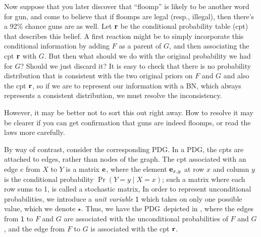 \documentclass{article}
\newcommand{\MN}{PDG}
\numberwithin{equation}{section}
\begin{document}
\begin{example}
		Now suppose that you later discover that ``floomp'' is likely to be another word for gun, and come to believe that if floomps are legal (resp., illegal), then there's a 92\% chance guns are as well. Let $\mathbf r$ be the conditional probability table (cpt) that describes this belief. A first reaction might be to simply incorporate this conditional information by adding $F$ as a parent of $G$, and then associating the cpt $\mathbf r$ with $G$. But then what should we do with the original probability we had for $G$?  Should we just discard it?
		It is easy to check that there is no probability distribution that is consistent with the two original priors on $F$ and $G$ and also the cpt $\mathbf r$, so if we are to represent our information with a BN, which always represents a consistent distribution, we must resolve the inconsistency.  
			
%		
		However, it may be better not to sort this out right away. How to resolve it may be clearer if you can get confirmation that guns are indeed floomps, or read the laws more carefully.

		By way of contrast, consider the corresponding \MN.
		In a \MN, the cpts are attached to edges, rather than nodes of the graph. The cpt associated with an edge $e$ from $X$ to $Y$ is a matrix $\mathbf e$, where the element $\mathbf e_{x,y}$ at row $x$ and column $y$ is the conditional probability $\Pr(Y \!\!=\!\!y \mid X \!\!=\!\! x)$; such a matrix where each row sums to 1, is called a stochastic matrix, In order to represent unconditional probabilities, we introduce a \emph{unit variable} $\mathsf 1$ which takes on only one possible value,	which we denote $\star$.
		Thus, we have the \MN\ depicted in , where the edges from $\mathsf 1$ to $F$ and $G$ are associated with the unconditional probabilities of $F$ and $G$, and the edge from $F$ to $G$ is associated with the cpt $\mathbf r$.
		\begin{figure}[h]
			\centering
\end{figure}
\end{example}
\end{document}
